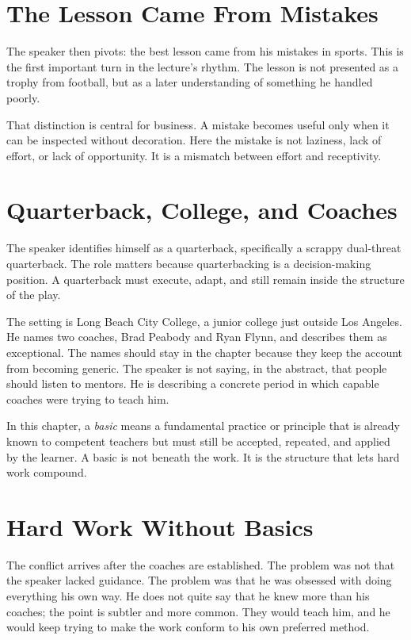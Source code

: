 \section{The Lesson Came From Mistakes}

The speaker then pivots: the best lesson came from his mistakes in sports. This is the first important turn in the lecture's rhythm. The lesson is not presented as a trophy from football, but as a later understanding of something he handled poorly.

That distinction is central for business. A mistake becomes useful only when it can be inspected without decoration. Here the mistake is not laziness, lack of effort, or lack of opportunity. It is a mismatch between effort and receptivity.

\section{Quarterback, College, and Coaches}

The speaker identifies himself as a quarterback, specifically a scrappy dual-threat quarterback. The role matters because quarterbacking is a decision-making position. A quarterback must execute, adapt, and still remain inside the structure of the play.

The setting is Long Beach City College, a junior college just outside Los Angeles. He names two coaches, Brad Peabody and Ryan Flynn, and describes them as exceptional. The names should stay in the chapter because they keep the account from becoming generic. The speaker is not saying, in the abstract, that people should listen to mentors. He is describing a concrete period in which capable coaches were trying to teach him.

\begin{definition}
In this chapter, a \emph{basic} means a fundamental practice or principle that is already known to competent teachers but must still be accepted, repeated, and applied by the learner. A basic is not beneath the work. It is the structure that lets hard work compound.
\end{definition}

\section{Hard Work Without Basics}

The conflict arrives after the coaches are established. The problem was not that the speaker lacked guidance. The problem was that he was obsessed with doing everything his own way. He does not quite say that he knew more than his coaches; the point is subtler and more common. They would teach him, and he would keep trying to make the work conform to his own preferred method.

